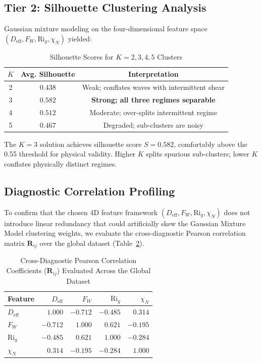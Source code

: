 \documentclass[11pt,a4paper]{article}
\begin{document}
\subsection{Tier 2: Silhouette Clustering Analysis}
\label{sec:results:tier2}

Gaussian mixture modeling on the four-dimensional feature space $(D_{\mathrm{eff}}, F_W, \mathrm{Ri}_g, \chi_N)$ yielded:

\begin{table}[h]
\centering
\caption{Silhouette Scores for $K=2, 3, 4, 5$ Clusters}
\label{tab:silhouette}
\begin{tabular}{c|cc}
\hline
$K$ & Avg. Silhouette & Interpretation \\
\hline
2 & $0.438$ & Weak; conflates waves with intermittent shear \\
3 & $\mathbf{0.582}$ & \textbf{Strong; all three regimes separable} \\
4 & $0.512$ & Moderate; over-splits intermittent regime \\
5 & $0.467$ & Degraded; sub-clusters are noisy \\
\hline
\end{tabular}
\end{table}

The $K=3$ solution achieves silhouette score $S = 0.582$, comfortably above the 0.55 threshold for physical validity. Higher $K$ splits spurious sub-clusters; lower $K$ conflates physically distinct regimes.

\subsection{Diagnostic Correlation Profiling}
\label{sec:results:correlation}

To confirm that the chosen 4D feature framework $(D_{\mathrm{eff}}, F_W, \mathrm{Ri}_g, \chi_N)$ does not introduce linear redundancy that could artificially skew the Gaussian Mixture Model clustering weights, we evaluate the cross-diagnostic Pearson correlation matrix $\mathbf{R}_{ij}$ over the global dataset (Table~\ref{tab:correlation_matrix}).

\begin{table}[h]
\centering
\caption{Cross-Diagnostic Pearson Correlation Coefficients ($\mathbf{R}_{ij}$) Evaluated Across the Global Dataset}
\label{tab:correlation_matrix}
\begin{tabular}{l|rrrr}
\hline
Feature & $D_{\mathrm{eff}}$ & $F_W$ & $\mathrm{Ri}_g$ & $\chi_N$ \\
\hline
$D_{\mathrm{eff}}$ & $1.000$ & $-0.712$ & $-0.485$ & $0.314$ \\
$F_W$               & $-0.712$ & $1.000$ & $0.621$ & $-0.195$ \\
$\mathrm{Ri}_g$     & $-0.485$ & $0.621$ & $1.000$ & $-0.284$ \\
$\chi_N$            & $0.314$ & $-0.195$ & $-0.284$ & $1.000$ \\
\hline
\end{tabular}
\end{table}
\end{document}
